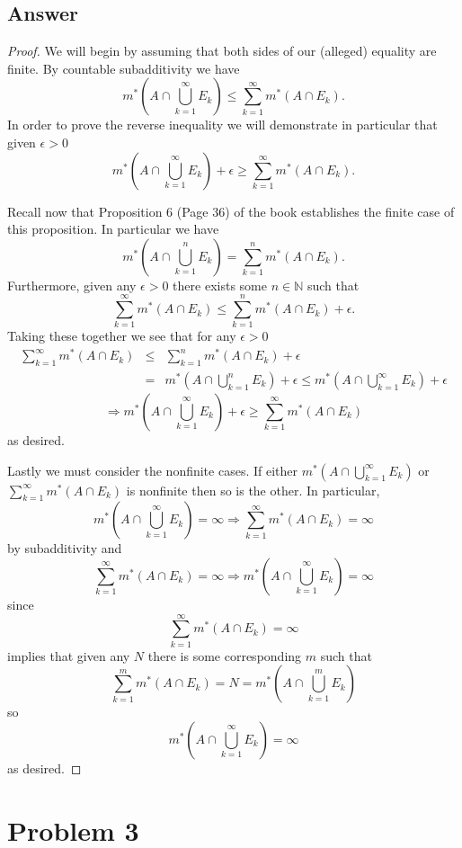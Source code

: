 \documentclass[12pt]{article}
\begin{document}
\subsection{Answer}
\begin{proof}
We will begin by assuming that both sides of our (alleged) equality are finite.
By countable subadditivity  we have
\[m^*\left( A \cap \bigcup_{k=1}^\infty E_k\right)  \leq \sum_{k=1}^\infty m^*(A \cap E_k).\]
In order to prove the reverse inequality we will demonstrate in particular that given $\epsilon > 0$
\[m^*\left( A \cap \bigcup_{k=1}^\infty E_k\right) + \epsilon \geq \sum_{k=1}^\infty m^*(A \cap E_k).\]

Recall now that Proposition 6 (Page 36) of the book establishes the finite case of this proposition. In particular we have 
\[m^*\left( A \cap \bigcup_{k=1}^n E_k\right) = \sum_{k=1}^n m^*(A \cap E_k).\]
Furthermore, given any $\epsilon>0$ there exists some $n \in \mathbb{N}$ such that 
\[\sum_{k=1}^\infty m^*(A \cap E_k) \leq \sum_{k=1}^n m^*(A \cap E_k) + \epsilon.\]
Taking these together we see that for any $\epsilon > 0$
\begin{eqnarray*}\sum_{k=1}^\infty m^*(A \cap E_k) &\leq& \sum_{k=1}^n m^*(A \cap E_k) + \epsilon \\ &=& m^*\left( A \cap \bigcup_{k=1}^n E_k\right)  + \epsilon \leq m^*\left( A \cap \bigcup_{k=1}^\infty E_k\right)  + \epsilon \end{eqnarray*}
\[  \Rightarrow m^*\left( A \cap \bigcup_{k=1}^\infty E_k\right)  + \epsilon \geq \sum_{k=1}^\infty m^*(A \cap E_k) \]
as desired.

Lastly we must consider the nonfinite cases. If either $m^*\left( A \cap \bigcup_{k=1}^\infty E_k\right)$ or $\sum_{k=1}^\infty m^*(A \cap E_k)$ is nonfinite then so is the other. In particular, 
\[m^*\left( A \cap \bigcup_{k=1}^\infty E_k\right) = \infty \Rightarrow \sum_{k=1}^\infty m^*(A \cap E_k) = \infty\]
by subadditivity and 
\[ \sum_{k=1}^\infty m^*(A \cap E_k) = \infty \Rightarrow m^*\left( A \cap \bigcup_{k=1}^\infty E_k\right) = \infty \]
since
\[ \sum_{k=1}^\infty m^*(A \cap E_k) = \infty\]
implies that given any $N$ there is some corresponding $m$ such that 
\[ \sum_{k=1}^m m^*(A \cap E_k) = N = m^*\left( A \cap \bigcup_{k=1}^m E_k\right) \]
so
\[ m^*\left( A \cap \bigcup_{k=1}^\infty E_k\right) = \infty\]
as desired.
\end{proof}

\section{Problem 3}
\end{document}
